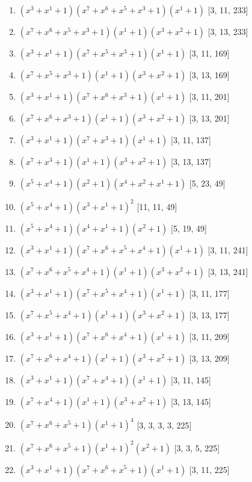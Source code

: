 \documentclass[10pt,twocolumn]{article}
\begin{document}
\begin{enumerate}
\item $(x^{3} + x^{1} + 1)(x^{7} + x^{6} + x^{5} + x^{3} + 1)(x^{1} + 1)$  [3, 11, 233]
\item $(x^{7} + x^{6} + x^{5} + x^{3} + 1)(x^{1} + 1)(x^{3} + x^{2} + 1)$  [3, 13, 233]
\item $(x^{3} + x^{1} + 1)(x^{7} + x^{5} + x^{3} + 1)(x^{1} + 1)$  [3, 11, 169]
\item $(x^{7} + x^{5} + x^{3} + 1)(x^{1} + 1)(x^{3} + x^{2} + 1)$  [3, 13, 169]
\item $(x^{3} + x^{1} + 1)(x^{7} + x^{6} + x^{3} + 1)(x^{1} + 1)$  [3, 11, 201]
\item $(x^{7} + x^{6} + x^{3} + 1)(x^{1} + 1)(x^{3} + x^{2} + 1)$  [3, 13, 201]
\item $(x^{3} + x^{1} + 1)(x^{7} + x^{3} + 1)(x^{1} + 1)$  [3, 11, 137]
\item $(x^{7} + x^{3} + 1)(x^{1} + 1)(x^{3} + x^{2} + 1)$  [3, 13, 137]
\item $(x^{5} + x^{4} + 1)(x^{2} + 1)(x^{4} + x^{2} + x^{1} + 1)$  [5, 23, 49]
\item $(x^{5} + x^{4} + 1)(x^{3} + x^{1} + 1)^{2}$  [11, 11, 49]
\item $(x^{5} + x^{4} + 1)(x^{4} + x^{1} + 1)(x^{2} + 1)$  [5, 19, 49]
\item $(x^{3} + x^{1} + 1)(x^{7} + x^{6} + x^{5} + x^{4} + 1)(x^{1} + 1)$  [3, 11, 241]
\item $(x^{7} + x^{6} + x^{5} + x^{4} + 1)(x^{1} + 1)(x^{3} + x^{2} + 1)$  [3, 13, 241]
\item $(x^{3} + x^{1} + 1)(x^{7} + x^{5} + x^{4} + 1)(x^{1} + 1)$  [3, 11, 177]
\item $(x^{7} + x^{5} + x^{4} + 1)(x^{1} + 1)(x^{3} + x^{2} + 1)$  [3, 13, 177]
\item $(x^{3} + x^{1} + 1)(x^{7} + x^{6} + x^{4} + 1)(x^{1} + 1)$  [3, 11, 209]
\item $(x^{7} + x^{6} + x^{4} + 1)(x^{1} + 1)(x^{3} + x^{2} + 1)$  [3, 13, 209]
\item $(x^{3} + x^{1} + 1)(x^{7} + x^{4} + 1)(x^{1} + 1)$  [3, 11, 145]
\item $(x^{7} + x^{4} + 1)(x^{1} + 1)(x^{3} + x^{2} + 1)$  [3, 13, 145]
\item $(x^{7} + x^{6} + x^{5} + 1)(x^{1} + 1)^{4}$  [3, 3, 3, 3, 225]
\item $(x^{7} + x^{6} + x^{5} + 1)(x^{1} + 1)^{2}(x^{2} + 1)$  [3, 3, 5, 225]
\item $(x^{3} + x^{1} + 1)(x^{7} + x^{6} + x^{5} + 1)(x^{1} + 1)$  [3, 11, 225]

\end{enumerate}
\end{document}
